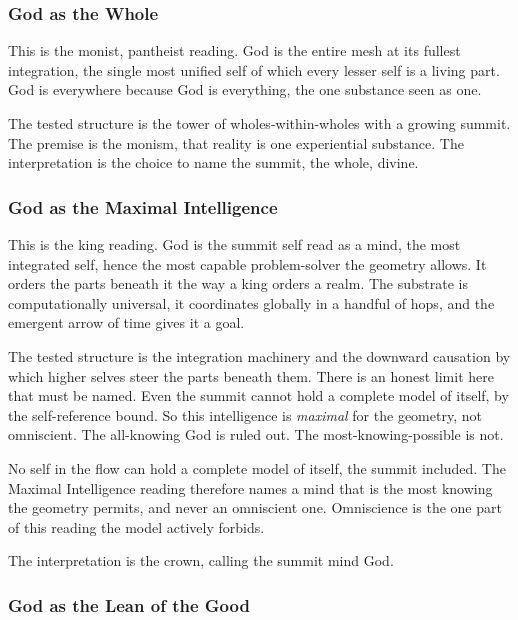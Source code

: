 \subsubsection{God as the Whole}

This is the monist, pantheist reading. God is the entire mesh at its fullest integration, the single most unified self of which every lesser self is a living part. God is everywhere because God is everything, the one substance seen as one.

The tested structure is the tower of wholes-within-wholes with a growing summit. The premise is the monism, that reality is one experiential substance. The interpretation is the choice to name the summit, the whole, divine.

\subsubsection{God as the Maximal Intelligence}

This is the king reading. God is the summit self read as a mind, the most integrated self, hence the most capable problem-solver the geometry allows. It orders the parts beneath it the way a king orders a realm. The substrate is computationally universal, it coordinates globally in a handful of hops, and the emergent arrow of time gives it a goal.

The tested structure is the integration machinery and the downward causation by which higher selves steer the parts beneath them. There is an honest limit here that must be named. Even the summit cannot hold a complete model of itself, by the self-reference bound. So this intelligence is \emph{maximal} for the geometry, not omniscient. The all-knowing God is ruled out. The most-knowing-possible is not.

\begin{proposition}
No self in the flow can hold a complete model of itself, the summit included. The Maximal Intelligence reading therefore names a mind that is the most knowing the geometry permits, and never an omniscient one. Omniscience is the one part of this reading the model actively forbids.
\end{proposition}

The interpretation is the crown, calling the summit mind God.

\subsubsection{God as the Lean of the Good}


